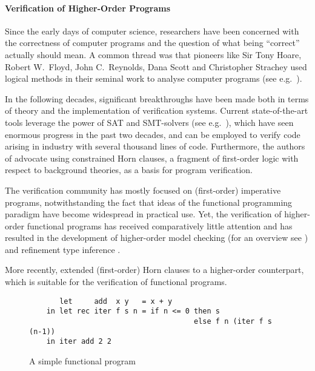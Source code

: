 \documentclass[a4paper,twoside,notitlepage,openright,11pt]{report}
\begin{document}
\paragraph{Verification of Higher-Order Programs}
Since the early days of computer science, researchers have been concerned with the correctness of computer programs and the question of what being ``correct'' actually should mean. A common thread was that pioneers like Sir Tony Hoare, Robert W.\ Floyd, John C.\ Reynolds, Dana Scott and Christopher Strachey used logical methods in their seminal work to analyse computer programs (see e.g.\ \cite{H69,F67,R72,SS71}).

In the following decades, significant breakthroughs have been made both in terms of theory and the implementation of verification systems. Current state-of-the-art tools leverage the power of SAT and SMT-solvers (see e.g.\ \cite{BSST09}), which have seen enormous progress in the past two decades, and can be employed to verify code arising in industry with several thousand lines of code.
Furthermore, the authors of \cite{BGMR15,BMR12,GLPR12} advocate using constrained Horn clauses, a fragment of first-order logic with respect to background theories, as a basis for program verification.

The verification community has mostly focused on (first-order) imperative programs, notwithstanding the fact that ideas of the functional programming paradigm have become widespread in practical use. Yet, the verification of higher-order functional programs has received comparatively little attention and has resulted in the development of higher-order model checking (for an overview see \cite{O15}) and refinement type inference \cite{UTK13}.

More recently, \cite{BOR18} extended (first-order) Horn clauses to a higher-order counterpart, which is suitable for the verification of functional programs.
\begin{figure}[t]
  \centering
  \begin{lstlisting}
       let     add  x y   = x + y
    in let rec iter f s n = if n <= 0 then s 
                                      else f n (iter f s (n-1))
    in iter add 2 2
  \end{lstlisting}
  \caption{A simple functional program}
  \label{fig:funcprgm}
\end{figure}
\end{document}
